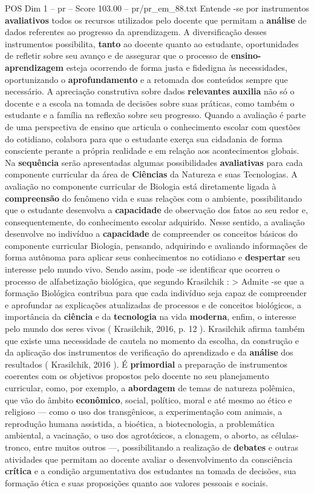 \begin{textsample}{POS Dim 1 – pr – Score 103.00 – pr/pr\_em\_88.txt}
Entende -se por instrumentos \textbf{avaliativos} todos os recursos utilizados pelo docente que permitam a \textbf{análise} de dados referentes ao progresso da aprendizagem.
A diversificação desses instrumentos possibilita, \textbf{tanto} ao docente quanto ao estudante, oportunidades de refletir sobre seu avanço e de assegurar que o processo de \textbf{ensino-aprendizagem} esteja ocorrendo de forma justa e fidedigna às necessidades, oportunizando o \textbf{aprofundamento} e a retomada dos conteúdos sempre que necessário.
A apreciação construtiva sobre dados \textbf{relevantes} \textbf{auxilia} não só o docente e a escola na tomada de decisões sobre suas práticas, como também o estudante e a família na reflexão sobre seu progresso.
Quando a avaliação é parte de uma perspectiva de ensino que articula o conhecimento escolar com questões do cotidiano, colabora para que o estudante exerça sua cidadania de forma consciente perante a própria realidade e em relação aos acontecimentos globais.
Na \textbf{sequência} serão apresentadas algumas possibilidades \textbf{avaliativas} para cada componente curricular da área de \textbf{Ciências} da Natureza e suas Tecnologias.
A avaliação no componente curricular de Biologia está diretamente ligada à \textbf{compreensão} do fenômeno vida e suas relações com o ambiente, possibilitando que o estudante desenvolva a \textbf{capacidade} de observação dos fatos ao seu redor e, consequentemente, do conhecimento escolar adquirido.
Nesse sentido, a avaliação desenvolve no indivíduo a \textbf{capacidade} de compreender os conceitos básicos do componente curricular Biologia, pensando, adquirindo e avaliando informações de forma autônoma para aplicar seus conhecimentos no cotidiano e \textbf{despertar} seu interesse pelo mundo vivo.
Sendo assim, pode -se identificar que ocorreu o processo de alfabetização biológica, que segundo Krasilchik : > Admite -se que a formação Biológica contribua para que cada indivíduo seja capaz de compreender e aprofundar as explicações atualizadas de processos e de conceitos biológicos, a importância da \textbf{ciência} e da \textbf{tecnologia} na vida \textbf{moderna}, enfim, o interesse pelo mundo dos seres vivos ( Krasilchik, 2016, p. 12 ).
Krasilchik afirma também que existe uma necessidade de cautela no momento da escolha, da construção e da aplicação dos instrumentos de verificação do aprendizado e da \textbf{análise} dos resultados ( Krasilchik, 2016 ).
É \textbf{primordial} a preparação de instrumentos coerentes com os objetivos propostos pelo docente no seu planejamento curricular, como, por exemplo, a \textbf{abordagem} de temas de natureza polêmica, que vão do âmbito \textbf{econômico}, social, político, moral e até mesmo ao ético e religioso — como o uso dos transgênicos, a experimentação com animais, a reprodução humana assistida, a bioética, a biotecnologia, a problemática ambiental, a vacinação, o uso dos agrotóxicos, a clonagem, o aborto, as células-tronco, entre muitos outros —, possibilitando a realização de \textbf{debates} e outras atividades que permitam ao docente avaliar o desenvolvimento da consciência \textbf{crítica} e a condição argumentativa dos estudantes na tomada de decisões, sua formação ética e suas proposições quanto aos valores pessoais e sociais.

\end{textsample}
